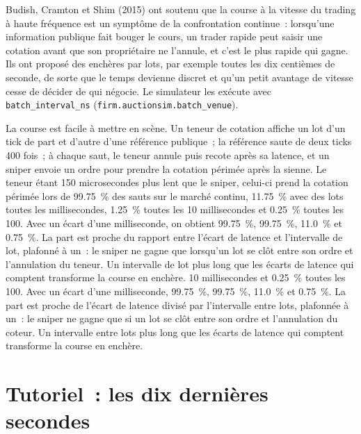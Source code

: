 Budish, Cramton et Shim (2015) ont soutenu que la course à la vitesse du trading à haute fréquence est un symptôme de la confrontation continue~: lorsqu'une information publique fait bouger le
cours, un trader rapide peut saisir une cotation avant que son propriétaire ne l'annule, et c'est le plus rapide qui gagne. Ils ont proposé des enchères par lots, par exemple toutes les dix
centièmes de seconde, de sorte que le temps devienne discret et qu'un petit avantage de vitesse cesse de décider de qui négocie. Le simulateur les exécute avec
\texttt{batch\_interval\_ns} (\texttt{firm.auctionsim.batch\_venue}).

La course est facile à mettre en scène. Un teneur de cotation affiche un lot d'un tick de part et d'autre d'une référence publique~; la référence saute de deux ticks 400 fois~; à chaque saut, le
teneur annule puis recote après sa latence, et un sniper envoie un ordre pour prendre la cotation périmée après la sienne. Le teneur étant 150 microsecondes plus lent que le sniper, celui-ci prend la cotation
périmée lors de 99.75~\% des sauts sur le marché continu, 11.75~\% avec des lots toutes les millisecondes, 1.25~\% toutes les 10 millisecondes et 0.25~\% toutes les 100. Avec un écart d'une milliseconde, on obtient 99.75~\%, 99.75~\%, 11.0~\% et 0.75~\%. La part est proche du rapport entre l'écart de latence et l'intervalle de lot, plafonné à un~: le sniper ne gagne que lorsqu'un lot se clôt entre son ordre et l'annulation du teneur. Un intervalle de lot plus long que les écarts de latence qui comptent transforme la course en enchère.
10 millisecondes et 0.25~\% toutes les 100. Avec un écart d'une milliseconde, 99.75~\%, 99.75~\%, 11.0~\% et 0.75~\%. La part est proche de l'écart de latence divisé par
l'intervalle entre lots, plafonnée à un~: le sniper ne gagne que si un lot se clôt entre son ordre et l'annulation du coteur. Un intervalle entre lots plus long que les
écarts de latence qui comptent transforme la course en enchère.

\section{Tutoriel~: les dix dernières secondes}\label{tut:mx:auction-mechanics-and-theory:tut}

